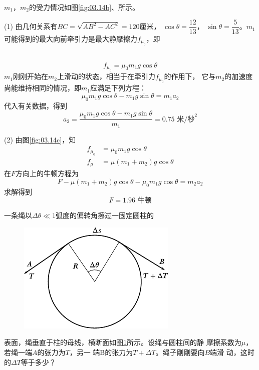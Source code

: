 \solution $m_1$，$m_2$的受力情况如图\ref{fig:03.14b}、所示。

(1) 由几何关系有$  B C = \sqrt { A B ^ { 2 } - A C ^ { 2 } } = 1 2 0  $厘米，
$ \cos \theta = \dfrac { 1 2 } { 1 3 } $，
$ \sin \theta = \dfrac { 5 } { 1 3 } $。$ m _ { 1 }  $
可能得到的最大向前牵引力是最大静摩擦力$  f _ { \mu _ 0 }  $，即

~\vspace{-1.5em}
\begin{equation*}
  f _ {\mu _ 0 } = \mu _ { 0 } m _ { 1 } g \cos \theta
\end{equation*}
$m_1$刚刚开始在$m_2$上滑动的状态，相当于在牵引力$ f _{\mu _ 0} $的作用下，
它与$m_2$的加速度尚能维持相同的情况，即$m_1$应满足下列方程：
\begin{equation*}
  \mu _ { 0 } m _ { 1 } g \cos \theta - m _ { 1 } g \sin \theta = m _ { 1 } a _ { 2 }
\end{equation*}
代入有关数据，得到
\begin{equation*}
  a _ { 2 } = \frac { \mu_{ 0 } m_1 g \cos \theta - m _ { 1 } g \sin \theta } { m _ { 1 } } = 0 . 7 5 \text{ 米/秒}^2
\end{equation*}

(2) 由图\ref{fig:03.14c}，知
\begin{align*}
  f _ { \mu _ 0 } & = \mu _ { 0 } m _ { 1 } g \cos \theta                    \\
  f _ { \mu }     & = \mu \left( m _ { 1 } + m _ { 2 } \right) g \cos \theta
\end{align*}
在$ F $方向上的牛顿方程为
\begin{equation*}
  F - \mu \left( m _ { 1 } + m _ { 2 } \right) g \cos \theta - \mu _ { 0 } m _ { 1 } g \cos \theta = m _ { 2 } a _ { 2 }
\end{equation*}
求解得到
\begin{equation*}
  F = 1 . 9 6 \text{ 牛顿}
\end{equation*}

\example 一条绳以$  \Delta \theta \ll 1  $弧度的偏转角擦过一固定圆柱的
\begin{figure}
  \centering
  \includegraphics{figure/fig03.15}
  \caption{}
  \label{fig:03.15}
\end{figure}
表面，绳垂直于柱的母线，横断面如图\ref{fig:03.15}\;所示。设绳与圆柱间的静
摩擦系数为$\mu$，若绳一端$ A $的张力为$ T $，另一
端B的张力为$  T + \Delta T $。绳子刚刚要向$ B $端滑
动，这时的$  \Delta T  $等于多少？

